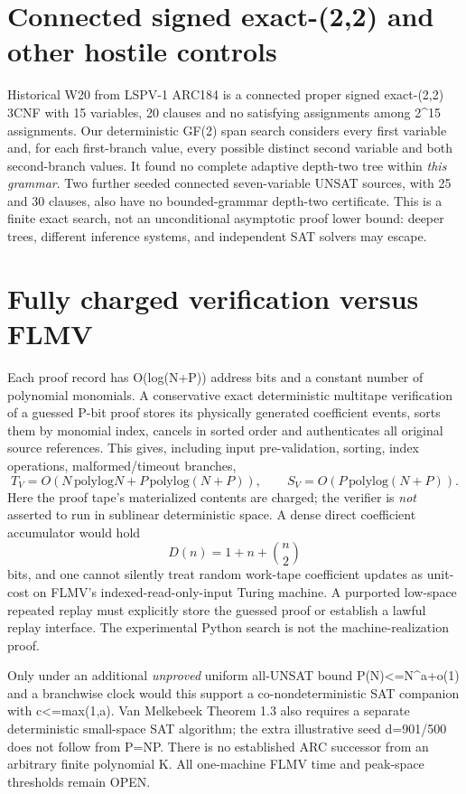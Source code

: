\documentclass[11pt]{article}
\begin{document}
\section{Connected signed exact-(2,2) and other hostile controls}
Historical W20 from LSPV-1 ARC184 is a connected proper signed exact-(2,2) 3CNF with 15 variables, 20 clauses and no satisfying assignments among 2^15 assignments. Our deterministic GF(2) span search considers every first variable and, for each first-branch value, every possible distinct second variable and both second-branch values. It found no complete adaptive depth-two tree within \emph{this grammar}. Two further seeded connected seven-variable UNSAT sources, with 25 and 30 clauses, also have no bounded-grammar depth-two certificate. This is a finite exact search, not an unconditional asymptotic proof lower bound: deeper trees, different inference systems, and independent SAT solvers may escape.

\section{Fully charged verification versus FLMV}
Each proof record has O(log(N+P)) address bits and a constant number of polynomial monomials. A conservative exact deterministic multitape verification of a guessed P-bit proof stores its physically generated coefficient events, sorts them by monomial index, cancels in sorted order and authenticates all original source references. This gives, including input pre-validation, sorting, index operations, malformed/timeout branches,
\[
T_V=O(N\,\mathrm{polylog}N+P\,\mathrm{polylog}(N+P)),\qquad
S_V=O(P\,\mathrm{polylog}(N+P)).
\]
Here the proof tape's materialized contents are charged; the verifier is \emph{not} asserted to run in sublinear deterministic space. A dense direct coefficient accumulator would hold
\[
D(n)=1+n+\binom n2
\]
bits, and one cannot silently treat random work-tape coefficient updates as unit-cost on FLMV's indexed-read-only-input Turing machine. A purported low-space repeated replay must explicitly store the guessed proof or establish a lawful replay interface. The experimental Python search is not the machine-realization proof.

Only under an additional \emph{unproved} uniform all-UNSAT bound P(N)<=N^{a+o(1)} and a branchwise clock would this support a co-nondeterministic SAT companion with c<=max(1,a). Van Melkebeek Theorem 1.3 also requires a separate deterministic small-space SAT algorithm; the extra illustrative seed d=901/500 does not follow from P=NP. There is no established ARC successor from an arbitrary finite polynomial K. All one-machine FLMV time and peak-space thresholds remain OPEN.
\end{document}
